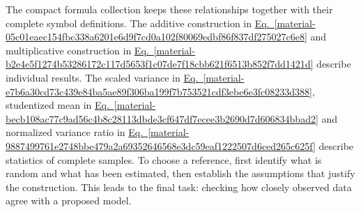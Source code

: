 \documentclass[11pt,a4paper]{article}
\begin{document}
The compact formula collection keeps these relationships together with their complete symbol definitions. The additive construction in \hyperref[material-05c01eaec154fbc338a6201e6d9f7cd0a102f80069edbf86f837df275027c6e8]{Eq.~\ref*{material-05c01eaec154fbc338a6201e6d9f7cd0a102f80069edbf86f837df275027c6e8}} and multiplicative construction in \hyperref[material-b2e4e5f1274b53286172c117d5653f1c07de7f18cbb621f6513b852f7dd1421d]{Eq.~\ref*{material-b2e4e5f1274b53286172c117d5653f1c07de7f18cbb621f6513b852f7dd1421d}} describe individual results. The scaled variance in \hyperref[material-e7b6a30cd73c439e84ba5ae89f306ba199f7b753521cdf3ebe6e3fc08233d388]{Eq.~\ref*{material-e7b6a30cd73c439e84ba5ae89f306ba199f7b753521cdf3ebe6e3fc08233d388}}, studentized mean in \hyperref[material-becb108ac77c9ad56c4b8c28113dbde3cf647df7ecee3b2690d7d606834bbad2]{Eq.~\ref*{material-becb108ac77c9ad56c4b8c28113dbde3cf647df7ecee3b2690d7d606834bbad2}} and normalized variance ratio in \hyperref[material-9887499761e2748bbe479a2a69352646568e3dc59eaf1222507d6ced265c625f]{Eq.~\ref*{material-9887499761e2748bbe479a2a69352646568e3dc59eaf1222507d6ced265c625f}} describe statistics of complete samples. To choose a reference, first identify what is random and what has been estimated, then establish the assumptions that justify the construction. This leads to the final task: checking how closely observed data agree with a proposed model.
\end{document}
